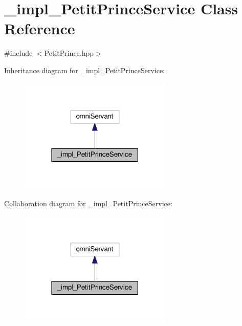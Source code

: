 \hypertarget{class__impl___petit_prince_service}{}\section{\+\_\+impl\+\_\+\+Petit\+Prince\+Service Class Reference}
\label{class__impl___petit_prince_service}


{\ttfamily \#include $<$Petit\+Prince.\+hpp$>$}



Inheritance diagram for \+\_\+impl\+\_\+\+Petit\+Prince\+Service\+:
\nopagebreak
\begin{figure}[H]
\begin{center}
\leavevmode
\includegraphics[width=206pt]{class__impl___petit_prince_service__inherit__graph}
\end{center}
\end{figure}


Collaboration diagram for \+\_\+impl\+\_\+\+Petit\+Prince\+Service\+:
\nopagebreak
\begin{figure}[H]
\begin{center}
\leavevmode
\includegraphics[width=206pt]{class__impl___petit_prince_service__coll__graph}
\end{center}
\end{figure}

